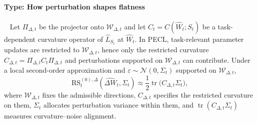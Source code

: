 \documentclass{article}
\theoremstyle{plain}
\theoremstyle{definition}
\theoremstyle{remark}
\begin{document}

\paragraph{Type: How perturbation shapes flatness } \
Let $\Pi_{\Delta,t}$ be the projector onto $\mathcal W_{\Delta,t}$ and let $C_t=C(\hat W_t;S_t)$ be a task-dependent curvature operator of $\hat L_{S_t}$ at $\hat W_t$.
In PECL, task-relevant parameter updates are restricted to $\mathcal W_{\Delta,t}$, hence only the restricted curvature $C_{\Delta,t}=\Pi_{\Delta,t}C_t\Pi_{\Delta,t}$ and perturbations supported on $\mathcal W_{\Delta,t}$ can contribute. 
Under a local second-order approximation and $\varepsilon\sim\mathcal N(0,\Sigma_t)$ supported on $\mathcal W_{\Delta,t}$,
$$
\mathrm{RS}_t^{(0),\Delta}(\hat{\Delta W}_t,\Sigma_t)
\approx
\frac12\operatorname{tr}\!\big(C_{\Delta,t}\Sigma_t\big),
$$ 
where $\mathcal W_{\Delta,t}$ fixes the admissible directions, $C_{\Delta,t}$ specifies the restricted curvature on them, $\Sigma_t$ allocates perturbation variance within them, and $\operatorname{tr}(C_{\Delta,t}\Sigma_t)$ measures curvature–noise alignment.
\end{document}
